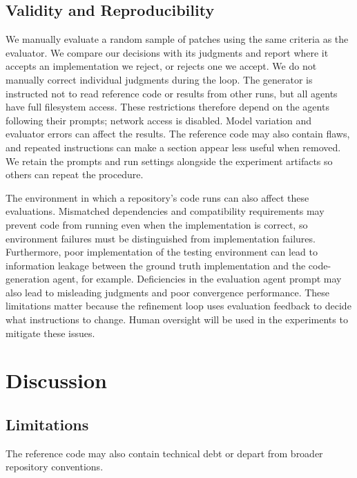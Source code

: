 \documentclass[sigconf,nonacm]{acmart}
\begin{document}
\subsection{Validity and Reproducibility}

We manually evaluate a random sample of patches using the same criteria as the evaluator. We compare our decisions with its judgments and report where it accepts an implementation we reject, or rejects one we accept. We do not manually correct individual judgments during the loop. The generator is instructed not to read reference code or results from other runs, but all agents have full filesystem access. These restrictions therefore depend on the agents following their prompts; network access is disabled. Model variation and evaluator errors can affect the results. The reference code may also contain flaws, and repeated instructions can make a section appear less useful when removed. We retain the prompts and run settings alongside the experiment artifacts so others can repeat the procedure.

The environment in which a repository's code runs can also affect these evaluations. Mismatched dependencies and compatibility requirements may prevent code from running even when the implementation is correct, so environment failures must be distinguished from implementation failures. Furthermore, poor implementation of the testing environment can lead to information leakage between the ground truth implementation and the code-generation agent, for example. Deficiencies in the evaluation agent prompt may also lead to misleading judgments and poor convergence performance. These limitations matter because the refinement loop uses evaluation feedback to decide what instructions to change. Human oversight will be used in the experiments to mitigate these issues.

\section{Discussion}

\subsection{Limitations}

The reference code may also contain technical debt or depart from broader repository conventions.



\end{document}
